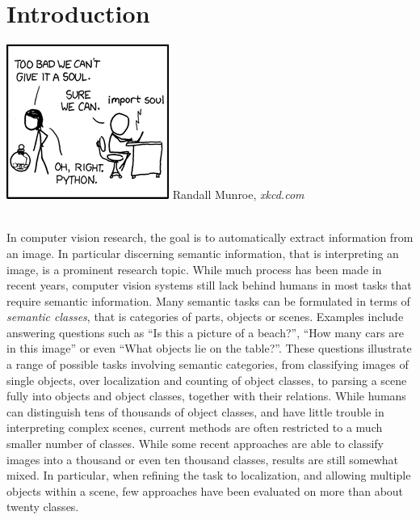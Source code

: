 \chapter{Introduction}
\vspace{1cm}
\hfill%
\begin{minipage}{.4\linewidth}
\includegraphics[width=\linewidth]{python_soul}%
\flushright%
Randall Munroe, \emph{xkcd.com}
\end{minipage}%
\\[2cm]
In computer vision research, the goal is to automatically extract information from an image.
In particular discerning semantic information, that is interpreting an image, is a prominent
research topic.
While much process has been made in recent years, computer vision systems still lack behind
humans in most tasks that require semantic information. Many semantic tasks can be formulated
in terms of \emph{semantic classes}, that is categories of parts, objects or scenes.
Examples include answering questions such as ``Is this a picture of a beach?'', ``How many
cars are in this image'' or even ``What objects lie on the table?''.
These questions illustrate a range of possible tasks involving semantic categories,
from classifying images of single objects, over localization and counting of object classes,
to parsing a scene fully into objects and object classes, together with their relations.
%
While humans can distinguish tens of thousands of object classes, and have little trouble
in interpreting complex scenes, current methods are often restricted to a much smaller number
of classes. While some recent approaches are able to classify images into a thousand 
or even ten thousand classes, results are still somewhat mixed.
In particular, when refining the task to localization, and allowing multiple objects within
a scene, few approaches have been evaluated on more than about twenty classes.

